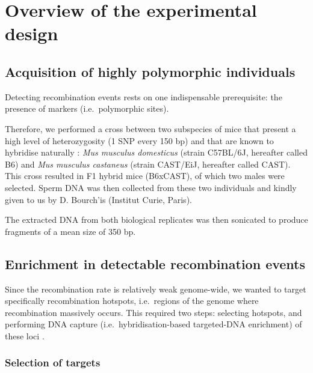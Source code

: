 \section{Overview of the experimental design}
\subsection{Acquisition of highly polymorphic individuals}

Detecting recombination events rests on one indispensable prerequisite: the presence of markers (i.e.\ polymorphic sites).

Therefore, we performed a cross between two subspecies of mice that present a high level of heterozygosity (1 SNP every 150 bp) \citep{keane2011mouse,yalcin2012nextgeneration} and that are known to hybridise naturally \citep{orth1998natural}: \textit{Mus musculus domesticus} (strain C57BL/6J, hereafter called B6) and \textit{Mus musculus castaneus} (strain CAST/EiJ, hereafter called CAST).
This cross resulted in F1 hybrid mice (B6xCAST), of which two males were selected. 
Sperm DNA was then collected from these two individuals and kindly given to us by D. Bourch'is (Institut Curie, Paris).

The extracted DNA from both biological replicates was then sonicated to produce fragments of a mean size of 350 bp.


\subsection{Enrichment in detectable recombination events}%

\begin{mccorrection}
Since the recombination rate is relatively weak genome-wide, we wanted to target specifically recombination hotspots, i.e.\ regions of the genome where recombination massively occurs.
This required two steps: selecting hotspots, and performing DNA capture (i.e.\ hybridisation-based targeted-DNA enrichment) of these loci \citep[reviewed in \citealp{horn2012target}]{gnirke2009solution,hodges2007genomewide}.
\end{mccorrection}

\subsubsection{Selection of targets}

